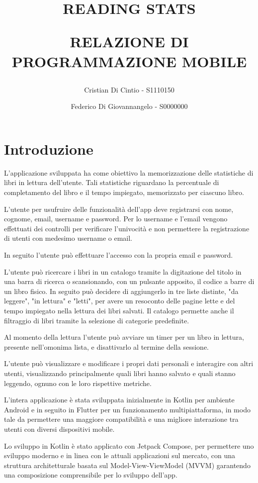 \documentclass{article}
\author{Cristian Di Cintio - S1110150 \and Federico Di Giovannangelo - S0000000}
\date{}
\title{READING STATS\par \large RELAZIONE DI PROGRAMMAZIONE MOBILE}
\begin{document}
\maketitle
\tableofcontents
\newpage

\section{Introduzione}

L'applicazione sviluppata ha come obiettivo la memorizzazione delle statistiche di libri in lettura dell'utente. Tali statistiche riguardano la percentuale di completamento del libro e il tempo impiegato, memorizzato per ciascuno libro.

L'utente per usufruire delle funzionalità dell'app deve registrarsi con nome, cognome, email, username e password. Per lo username e l'email vengono effettuati dei controlli per verificare l'univocità e non permettere la registrazione di utenti con medesimo username o email.

In seguito l'utente può effettuare l'accesso con la propria email e password.

L'utente può ricercare i libri in un catalogo tramite la digitazione del titolo in una barra di ricerca o scansionando, con un pulsante apposito, il codice a barre di un libro fisico. In seguito può decidere di aggiungerlo in tre liste distinte, "da leggere", "in lettura" e "letti", 
per avere un resoconto delle pagine lette e del tempo impiegato nella lettura dei libri salvati. Il catalogo permette anche il filtraggio di libri tramite la selezione di categorie predefinite.

Al momento della lettura l'utente può avviare un timer per un libro in lettura, presente nell'omonima lista, e disattivarlo al termine della sessione.

L'utente può visualizzare e modificare i propri dati personali e interagire con altri utenti, visualizzando principalmente quali libri hanno salvato e quali stanno leggendo, ognuno con le loro rispettive metriche.

L'intera applicazione è stata sviluppata inizialmente in Kotlin per ambiente Android e in seguito in Flutter per un funzionamento multipiattaforma, in modo tale da permettere una maggiore compatibilità e una migliore interazione tra utenti con diversi dispositivi mobile.

Lo sviluppo in Kotlin è stato applicato con Jetpack Compose, per permettere uno sviluppo moderno e in linea con le attuali applicazioni sul mercato, con una struttura architetturale basata sul Model-View-ViewModel (MVVM) garantendo una composizione comprensibile per lo sviluppo dell'app.
\end{document}
